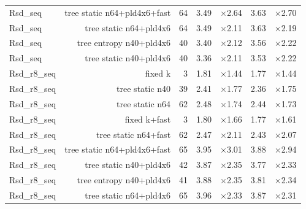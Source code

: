 \begin{table}[t]
\begin{tabular}{lrrrrrr}
Rsd\_seq & tree static n64+pld4x6+fast & 64 & 3.49 & $\times$2.64 & 3.63 & $\times$2.70 \\
Rsd\_seq & tree static n64+pld4x6 & 64 & 3.49 & $\times$2.11 & 3.63 & $\times$2.19 \\
Rsd\_seq & tree entropy n40+pld4x6 & 40 & 3.40 & $\times$2.12 & 3.56 & $\times$2.22 \\
Rsd\_seq & tree static n40+pld4x6 & 40 & 3.36 & $\times$2.11 & 3.53 & $\times$2.22 \\
Rsd\_r8\_seq & fixed k & 3 & 1.81 & $\times$1.44 & 1.77 & $\times$1.44 \\
Rsd\_r8\_seq & tree static n40 & 39 & 2.41 & $\times$1.77 & 2.36 & $\times$1.75 \\
Rsd\_r8\_seq & tree static n64 & 62 & 2.48 & $\times$1.74 & 2.44 & $\times$1.73 \\
Rsd\_r8\_seq & fixed k+fast & 3 & 1.80 & $\times$1.66 & 1.77 & $\times$1.61 \\
Rsd\_r8\_seq & tree static n64+fast & 62 & 2.47 & $\times$2.11 & 2.43 & $\times$2.07 \\
Rsd\_r8\_seq & tree static n64+pld4x6+fast & 65 & 3.95 & $\times$3.01 & 3.88 & $\times$2.94 \\
Rsd\_r8\_seq & tree static n40+pld4x6 & 42 & 3.87 & $\times$2.35 & 3.77 & $\times$2.33 \\
Rsd\_r8\_seq & tree entropy n40+pld4x6 & 41 & 3.88 & $\times$2.35 & 3.81 & $\times$2.34 \\
Rsd\_r8\_seq & tree static n64+pld4x6 & 65 & 3.96 & $\times$2.33 & 3.87 & $\times$2.31 \\
\bottomrule
\end{tabular}
\end{table}
